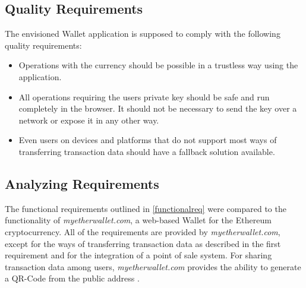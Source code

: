 \subsection{Quality Requirements}\label{qualityrequirements}
The envisioned Wallet application is supposed to comply with the following quality requirements:
\begin{itemize}
\item Operations with the currency should be possible in a trustless way using the application.
\item All operations requiring the users private key should be safe and run completely in the browser. It should not be necessary to send the key over a network or expose it in any other way.
\item Even users on devices and platforms that do not support most ways of transferring transaction data should have a fallback solution available.

\end{itemize}
\subsection{Analyzing Requirements}\label{requirementsanalysis}

The functional requirements outlined in \ref{functionalreq} were compared to the functionality of \textit{myetherwallet.com}, a web-based Wallet for the Ethereum cryptocurrency. All of the requirements are provided by \textit{myetherwallet.com}, except for the ways of transferring transaction data as described in the first requirement and for the integration of a point of sale system. For sharing transaction data among users, \textit{myetherwallet.com} provides the ability to generate a QR-Code from the public address \cite{myethwallet}.

